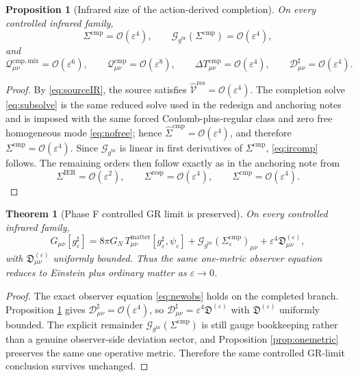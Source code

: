 \documentclass[11pt]{article}
\newcommand{\ObserverMetric}{g^{\mathrm{br}}}
\newcommand{\CompletedMetric}{g^{\sharp}}
\newcommand{\BaseShift}{\Sigma^{\mathrm{IER}}}
\newcommand{\ResponseShift}{\Sigma^{\mathrm{resp}}}
\newcommand{\CompShift}{\Sigma^{\mathrm{cmp}}}
\newcommand{\CompLift}{\widehat\Sigma^{\mathrm{cmp}}}
\newcommand{\ResidualLift}{\widehat{\mathcal V}^{\mathrm{res}}}
\newcommand{\GaugeBook}{\mathcal G_{\ObserverMetric}}
\newcommand{\CompMix}{\mathcal Q_{\mu\nu}^{\mathrm{cmp,mix}}}
\newcommand{\CompQuad}{\mathcal Q_{\mu\nu}^{\mathrm{cmp}}}
\newcommand{\CompDec}{\mathcal D_{\mu\nu}^{\sharp}}
\newcommand{\DeltaTComp}{\Delta T_{\mu\nu}^{\mathrm{cmp}}}
\newcommand{\epsIR}{\varepsilon}
\newtheorem{proposition}{Proposition}
\newtheorem{theorem}{Theorem}
\begin{document}
\begin{proposition}[Infrared size of the action-derived completion]
\label{prop:size}
On every controlled infrared family,
\begin{equation}
\CompShift=\mathcal O(\epsIR^4),
\qquad
\GaugeBook(\CompShift)=\mathcal O(\epsIR^4),
\label{eq:ircomp}
\end{equation}
and
\begin{equation}
\CompMix=\mathcal O(\epsIR^6),
\qquad
\CompQuad=\mathcal O(\epsIR^8),
\qquad
\DeltaTComp=\mathcal O(\epsIR^4),
\qquad
\CompDec=\mathcal O(\epsIR^4).
\label{eq:irsizes}
\end{equation}
\end{proposition}

\begin{proof}
By \eqref{eq:sourceIR}, the source satisfies \(\ResidualLift=\mathcal O(\epsIR^4)\). The completion solve \eqref{eq:subsolve} is the same reduced solve used in the redesign and anchoring notes and is imposed with the same forced Coulomb-plus-regular class and zero free homogeneous mode \eqref{eq:nofree}; hence \(\CompLift=\mathcal O(\epsIR^4)\), and therefore \(\CompShift=\mathcal O(\epsIR^4)\). Since \(\GaugeBook\) is linear in first derivatives of \(\CompShift\), \eqref{eq:ircomp} follows. The remaining orders then follow exactly as in the anchoring note from
\[
\BaseShift=\mathcal O(\epsIR^2),
\qquad
\ResponseShift=\mathcal O(\epsIR^4),
\qquad
\CompShift=\mathcal O(\epsIR^4).
\]
\end{proof}

\begin{theorem}[Phase F controlled GR limit is preserved]
\label{thm:phaseF}
On every controlled infrared family,
\begin{equation}
G_{\mu\nu}[\CompletedMetric_{\epsIR}]
=
8\pi G_N\,T_{\mu\nu}^{\mathrm{matter}}[\CompletedMetric_{\epsIR},\psi_{\epsIR}]
+\GaugeBook(\CompShift_{\epsIR})_{\mu\nu}
+\epsIR^4\mathfrak D_{\mu\nu}^{(\epsIR)},
\label{eq:phaseFnew}
\end{equation}
with \(\mathfrak D_{\mu\nu}^{(\epsIR)}\) uniformly bounded. Thus the same one-metric observer equation reduces to Einstein plus ordinary matter as \(\epsIR\to 0\).
\end{theorem}

\begin{proof}
The exact observer equation \eqref{eq:newobs} holds on the completed branch. Proposition \ref{prop:size} gives \(\CompDec=\mathcal O(\epsIR^4)\), so \(\CompDec=\epsIR^4\mathfrak D^{(\epsIR)}\) with \(\mathfrak D^{(\epsIR)}\) uniformly bounded. The explicit remainder \(\GaugeBook(\CompShift)\) is still gauge bookkeeping rather than a genuine observer-side deviation sector, and Proposition \ref{prop:onemetric} preserves the same one operative metric. Therefore the same controlled GR-limit conclusion survives unchanged.
\end{proof}
\end{document}
